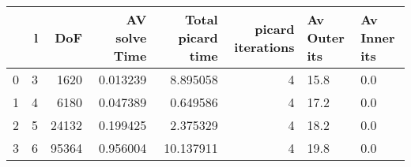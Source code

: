 \begin{tabular}{lrrrrrll}
\toprule
{} &  l &    DoF &  AV solve Time &  Total picard time &  picard iterations & Av Outer its & Av Inner its \\
\midrule
0 &  3 &   1620 &       0.013239 &           8.895058 &                  4 &         15.8 &          0.0 \\
1 &  4 &   6180 &       0.047389 &           0.649586 &                  4 &         17.2 &          0.0 \\
2 &  5 &  24132 &       0.199425 &           2.375329 &                  4 &         18.2 &          0.0 \\
3 &  6 &  95364 &       0.956004 &          10.137911 &                  4 &         19.8 &          0.0 \\
\bottomrule
\end{tabular}
